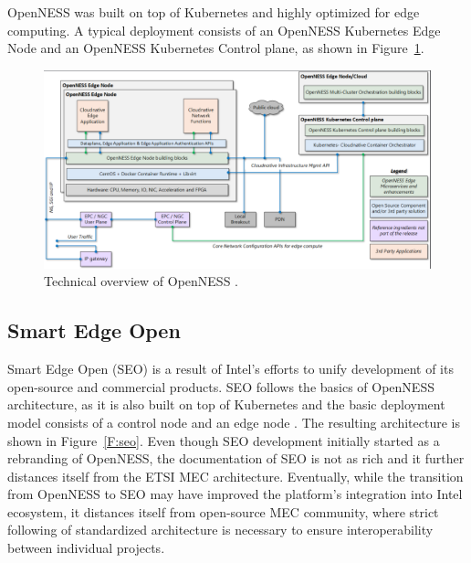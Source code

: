 \documentclass[12pt,a4paper,twoside]{report}
\begin{document}
OpenNESS was built on top of Kubernetes and highly optimized for edge computing. A typical deployment consists of an OpenNESS Kubernetes Edge Node and an OpenNESS Kubernetes Control plane, as shown in Figure~\ref{F:openness}. \cite{openness-git}
\begin{figure}[ht]
	\centering
	\includegraphics[width=13cm]{./images/openness.png} 
	\caption{Technical overview of OpenNESS \cite{openness-git}.}
	\label{F:openness}
\end{figure}

\subsection{Smart Edge Open}
Smart Edge Open (SEO) is a result of Intel’s efforts to unify development of its open-source and commercial products. SEO follows the basics of OpenNESS architecture, as it is also built on top of Kubernetes and the basic deployment model consists of a control node and an edge node \cite{seo-doc}. The resulting architecture is shown in Figure~\ref{F:seo}. Even though SEO development initially started as a rebranding of OpenNESS, the documentation of SEO is not as rich and it further distances itself from the ETSI MEC architecture. Eventually, while the transition from OpenNESS to SEO may have improved the platform’s integration into Intel ecosystem, it distances itself from open-source MEC community, where strict following of standardized architecture is necessary to ensure interoperability between individual projects. 
\end{document}
